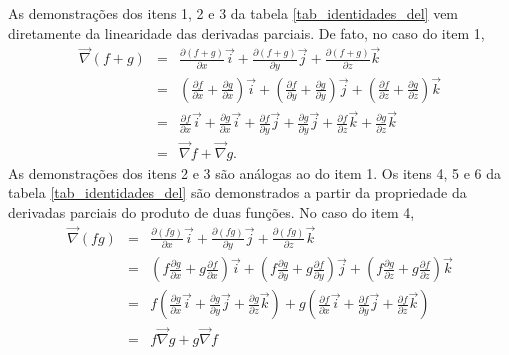 As demonstrações dos itens 1, 2 e 3 da tabela \ref{tab_identidades_del} vem diretamente da linearidade das derivadas parciais. De fato, no caso do item 1,
\begin{eqnarray*}
\vec{\nabla}(f+g)&=&\frac{\partial (f+g)}{\partial x}\vec{i}+\frac{\partial (f+g)}{\partial y}\vec{j}+\frac{\partial (f+g)}{\partial z}\vec{k} \\
&=&\left(\frac{\partial f}{\partial x}+\frac{\partial g}{\partial x}\right)\vec{i}+\left(\frac{\partial f}{\partial y}+\frac{\partial g}{\partial y}\right)\vec{j}+\left(\frac{\partial f}{\partial z}+\frac{\partial g}{\partial z}\right)\vec{k}\\
&=&\frac{\partial f}{\partial x}\vec{i}+\frac{\partial g}{\partial x}\vec{i}+\frac{\partial f}{\partial y}\vec{j}+\frac{\partial g}{\partial y}\vec{j}+\frac{\partial f}{\partial z}\vec{k}+\frac{\partial g}{\partial z}\vec{k}\\
&=&\vec{\nabla}f+\vec{\nabla}g.
\end{eqnarray*}
As demonstrações dos itens 2 e 3 são análogas ao do item 1. Os itens 4, 5 e 6 da tabela \ref{tab_identidades_del} são demonstrados a partir da propriedade da derivadas parciais do produto de duas funções. No caso do item 4,
\begin{eqnarray*}
\vec{\nabla}(fg)&=&\frac{\partial (fg)}{\partial x}\vec{i}+\frac{\partial (fg)}{\partial y}\vec{j}+\frac{\partial (fg)}{\partial z}\vec{k} \\
&=&\left(f\frac{\partial g}{\partial x}+g\frac{\partial f}{\partial x}\right)\vec{i}+\left(f\frac{\partial g}{\partial y}+g\frac{\partial f}{\partial y}\right)\vec{j}+\left(f\frac{\partial g}{\partial z}+g\frac{\partial f}{\partial z}\right)\vec{k}\\
&=&f\left(\frac{\partial g}{\partial x}\vec{i}+\frac{\partial g}{\partial y}\vec{j}+\frac{\partial g}{\partial z}\vec{k}\right)+g\left(\frac{\partial f}{\partial x}\vec{i}+\frac{\partial f}{\partial y}\vec{j}+\frac{\partial f}{\partial z}\vec{k}\right)\\
&=&f\vec{\nabla}g+g\vec{\nabla}f
\end{eqnarray*}


